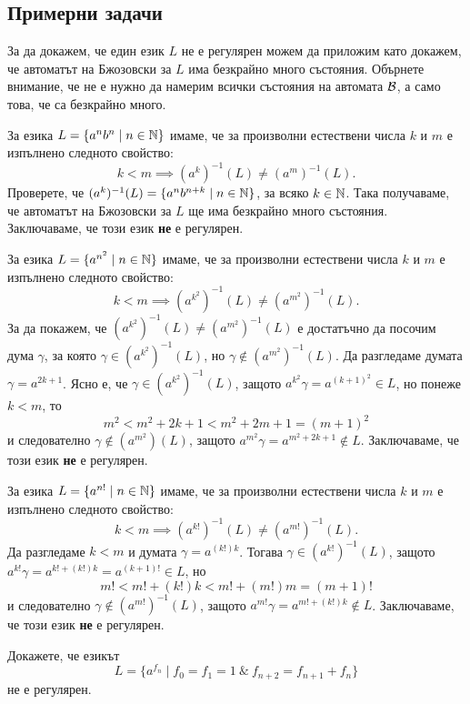 \subsection*{Примерни задачи}

За да докажем, че един език $L$ не е регулярен можем да приложим 
като докажем, че автоматът на Бжозовски за $L$ има безкрайно много състояния.
Обърнете внимание, че не е нужно да намерим всички състояния на автомата $\mathcal{B}$, а само това, че са безкрайно много.

\begin{example}
  За езика $L = \{a^nb^n\mid n \in \mathbb{N}\}$ имаме, че за произволни естествени числа $k$ и $m$ е изпълнено следното свойство:
  \[k < m \implies (a^k)^{-1}(L) \neq (a^m)^{-1}(L).\]
  Проверете, че $(a^k)^{-1}(L) = \{a^{n}b^{n+k} \mid n\in\mathbb{N}\}$, за всяко $k \in \mathbb{N}$.
  Така получаваме, че автоматът на Бжозовски за $L$ ще има безкрайно много състояния.
  Заключаваме, че този език {\bf не} е регулярен.
\end{example}

\begin{example}
  За езика $L = \{a^{n^2} \mid n \in \mathbb{N}\}$ имаме, че за произволни естествени числа $k$ и $m$ е изпълнено следното свойство:
  \[k < m \implies (a^{k^2})^{-1}(L) \neq (a^{m^2})^{-1}(L).\]
  За да покажем, че $(a^{k^2})^{-1}(L) \neq (a^{m^2})^{-1}(L)$ е достатъчно да посочим дума $\gamma$, за която $ \gamma \in (a^{k^2})^{-1}(L)$, но $\gamma \not\in (a^{m^2})^{-1}(L)$.
  Да разгледаме думата $\gamma = a^{2k+1}$. Ясно е, че $\gamma \in (a^{k^2})^{-1}(L)$, защото $a^{k^2}\gamma = a^{(k+1)^2} \in L$, но понеже $k < m$, то
  \[m^2 < m^2 + 2k + 1 < m^2 + 2m + 1 = (m+1)^2\]
  и следователно $\gamma \not\in (a^{m^2})(L)$, защото $a^{m^2}\gamma = a^{m^2+2k+1}\not\in L$.
  Заключаваме, че този език {\bf не} е регулярен.
\end{example}

\begin{example}
  За езика $L = \{a^{n!} \mid n \in \mathbb{N}\}$ имаме, че за произволни естествени числа $k$ и $m$ е изпълнено следното свойство:
  \[k < m \implies (a^{k!})^{-1}(L) \neq (a^{m!})^{-1}(L).\]
  Да разгледаме $k < m$ и думата $\gamma = a^{(k!)k}$.
  Тогава $\gamma \in (a^{k!})^{-1}(L)$, защото $a^{k!}\gamma = a^{k! + (k!)k} = a^{(k+1)!} \in L$, но 
  \[m! < m! + (k!)k < m! + (m!)m = (m+1)!\]
  и следователно $\gamma \not\in (a^{m!})^{-1}(L)$, защото $a^{m!}\gamma = a^{m!+(k!)k}\not\in L$.
  Заключаваме, че този език {\bf не} е регулярен.
\end{example}

\begin{problem}
  Докажете, че езикът 
  \[L = \{a^{f_n} \mid f_0 = f_1 = 1\ \&\ f_{n+2} = f_{n+1} + f_{n}\}\]
  не е регулярен.
\end{problem}

